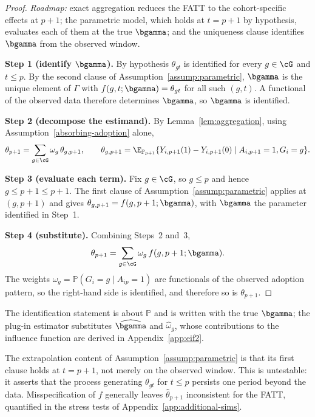 \documentclass{article}
\renewcommand{\P}{\mathbb{P}}
\begin{document}
\begin{proof}
\textit{Roadmap:} exact aggregation reduces the FATT to the cohort-specific effects at $p+1$; the parametric model, which holds at $t=p+1$ by hypothesis, evaluates each of them at the true $\bgamma$; and the uniqueness clause identifies $\bgamma$ from the observed window.

\textbf{Step 1 (identify $\bgamma$).} By hypothesis $\theta_{gt}$ is identified for every $g \in \cG$ and $t \leq p$. By the second clause of Assumption~\ref{assump:parametric}, $\bgamma$ is the unique element of $\Gamma$ with $f(g,t;\bgamma) = \theta_{gt}$ for all such $(g,t)$. A functional of the observed data therefore determines $\bgamma$, so $\bgamma$ is identified.

\textbf{Step 2 (decompose the estimand).} By Lemma~\ref{lem:aggregation}, using Assumption~\ref{absorbing-adoption} alone,
\[
\theta_{p+1} = \sum_{g \in \cG} \omega_g\, \theta_{g,p+1}, \qquad \theta_{g,p+1} = \E_{\P_{p+1}}\{Y_{i,p+1}(1)-Y_{i,p+1}(0) \mid A_{i,p+1}=1, G_i=g\}.
\]

\textbf{Step 3 (evaluate each term).} Fix $g \in \cG$, so $g \leq p$ and hence $g \leq p+1 \leq p+1$. The first clause of Assumption~\ref{assump:parametric} applies at $(g,p+1)$ and gives $\theta_{g,p+1} = f(g,p+1;\bgamma)$, with $\bgamma$ the parameter identified in Step~1.

\textbf{Step 4 (substitute).} Combining Steps~2 and~3,
\[
\theta_{p+1} = \sum_{g \in \cG} \omega_g\, f(g,p+1;\bgamma).
\]
The weights $\omega_g = \P(G_i=g \mid A_{ip}=1)$ are functionals of the observed adoption pattern, so the right-hand side is identified, and therefore so is $\theta_{p+1}$.
\end{proof}

\begin{remark}
The identification statement is about $\P$ and is written with the true $\bgamma$; the plug-in estimator substitutes $\widehat{\bgamma}$ and $\widehat{\omega}_g$, whose contributions to the influence function are derived in Appendix~\ref{app:eif2}.
\end{remark}

\begin{remark}
The extrapolation content of Assumption~\ref{assump:parametric} is that its first clause holds at $t = p+1$, not merely on the observed window. This is untestable: it asserts that the process generating $\theta_{gt}$ for $t \leq p$ persists one period beyond the data. Misspecification of $f$ generally leaves $\widehat{\theta}_{p+1}$ inconsistent for the FATT, quantified in the stress tests of Appendix~\ref{app:additional-sims}.
\end{remark}
\end{document}
